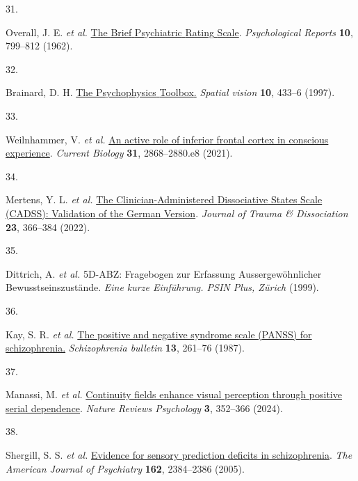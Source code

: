 \documentclass[
]{article}
\newlength{\cslhangindent}
\newlength{\csllabelwidth}
\newenvironment{CSLReferences}[2] %
 {\begin{list}{}{%
  \setlength{\itemindent}{0pt}
  \setlength{\leftmargin}{0pt}
  \setlength{\parsep}{0pt}
  \ifodd #1
   \setlength{\leftmargin}{\cslhangindent}
   \setlength{\itemindent}{-1\cslhangindent}
  \fi
  \setlength{\itemsep}{#2\baselineskip}}}
 {\end{list}}
\newcommand{\CSLLeftMargin}[1]{\parbox[t]{\csllabelwidth}{\strut#1\strut}}
\newcommand{\CSLRightInline}[1]{\parbox[t]{\linewidth - \csllabelwidth}{\strut#1\strut}}
\begin{document}
\begin{CSLReferences}{0}{0}
\CSLLeftMargin{31. }%
\CSLRightInline{Overall, J. E. \emph{et al.}
\href{https://doi.org/10.2466/pr0.1962.10.3.799}{The {Brief}
{Psychiatric} {Rating} {Scale}}. \emph{Psychological Reports}
\textbf{10}, 799--812 (1962).}

\CSLLeftMargin{32. }%
\CSLRightInline{Brainard, D. H.
\href{https://www.ncbi.nlm.nih.gov/pubmed/9176952}{The {Psychophysics}
{Toolbox}.} \emph{Spatial vision} \textbf{10}, 433--6 (1997).}

\CSLLeftMargin{33. }%
\CSLRightInline{Weilnhammer, V. \emph{et al.}
\href{https://doi.org/10.1016/j.cub.2021.04.043}{An active role of
inferior frontal cortex in conscious experience}. \emph{Current Biology}
\textbf{31}, 2868--2880.e8 (2021).}

\CSLLeftMargin{34. }%
\CSLRightInline{Mertens, Y. L. \emph{et al.}
\href{https://doi.org/10.1080/15299732.2021.1989111}{The
{Clinician}-{Administered} {Dissociative} {States} {Scale} ({CADSS}):
{Validation} of the {German} {Version}}. \emph{Journal of Trauma \&
Dissociation} \textbf{23}, 366--384 (2022).}

\CSLLeftMargin{35. }%
\CSLRightInline{Dittrich, A. \emph{et al.} {5D}-{ABZ}: {Fragebogen} zur
{Erfassung} {Aussergewöhnlicher} {Bewusstseinszustände}. \emph{Eine
kurze Einführung. PSIN Plus, Zürich} (1999).}

\CSLLeftMargin{36. }%
\CSLRightInline{Kay, S. R. \emph{et al.}
\href{https://www.ncbi.nlm.nih.gov/pubmed/3616518}{The positive and
negative syndrome scale ({PANSS}) for schizophrenia.}
\emph{Schizophrenia bulletin} \textbf{13}, 261--76 (1987).}

\CSLLeftMargin{37. }%
\CSLRightInline{Manassi, M. \emph{et al.}
\href{https://doi.org/10.1038/s44159-024-00297-x}{Continuity fields
enhance visual perception through positive serial dependence}.
\emph{Nature Reviews Psychology} \textbf{3}, 352--366 (2024).}

\CSLLeftMargin{38. }%
\CSLRightInline{Shergill, S. S. \emph{et al.}
\href{https://doi.org/10.1176/appi.ajp.162.12.2384}{Evidence for sensory
prediction deficits in schizophrenia}. \emph{The American Journal of
Psychiatry} \textbf{162}, 2384--2386 (2005).}


\end{CSLReferences}
\end{document}
